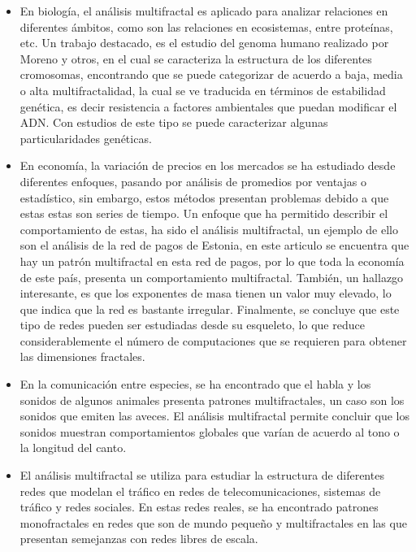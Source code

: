 \begin{itemize}
    \item En biología, el análisis multifractal es aplicado para analizar relaciones en diferentes ámbitos\cite{Barat2016}, como son las relaciones en ecosistemas, entre proteínas\cite{Wang2014}, etc. Un trabajo destacado, es el estudio del genoma humano realizado por Moreno y otros\cite{Moreno2011}, en el cual se caracteriza la estructura de los diferentes cromosomas, encontrando que se puede categorizar de acuerdo a baja, media o alta multifractalidad, la cual se ve traducida en términos de estabilidad genética, es decir resistencia a factores ambientales que puedan modificar el ADN. Con estudios de este tipo se puede caracterizar algunas particularidades genéticas.
    \item En economía, la variación de precios en los mercados se ha estudiado desde diferentes enfoques, pasando por análisis de promedios por ventajas o estadístico, sin embargo, estos métodos presentan problemas debido a que estas estas son series de tiempo\cite{Siokis2014}. Un enfoque que ha permitido describir el comportamiento de estas, ha sido el análisis multifractal, un ejemplo de ello son el análisis de la red de pagos de Estonia\cite{RendondelaTorre2017}, en este articulo se encuentra que hay un patrón multifractal en esta red de pagos, por lo que toda la economía de este país, presenta un comportamiento multifractal. También, un hallazgo interesante, es que los exponentes de masa tienen un valor muy elevado, lo que indica que la red es bastante irregular. Finalmente, se concluye que este tipo de redes pueden ser estudiadas desde su esqueleto, lo que reduce considerablemente el número de computaciones que se requieren para obtener las dimensiones fractales.
    \item En la comunicación entre especies, se ha encontrado que el habla y los sonidos de algunos animales presenta patrones multifractales, un caso son los sonidos que emiten las aveces\cite{Roeske2018}. El análisis multifractal permite concluir que los sonidos muestran comportamientos globales que varían de acuerdo al tono o la longitud del canto.
    \item El análisis multifractal se utiliza para estudiar la estructura de diferentes redes que modelan el tráfico en redes de telecomunicaciones\cite{DinhDang2004}, sistemas de tráfico\cite{Vojak1994} y redes sociales\cite{Wei2017}. En estas redes reales, se ha encontrado patrones monofractales en redes que son de mundo pequeño y multifractales en las que presentan semejanzas con redes libres de escala.
\end{itemize}


